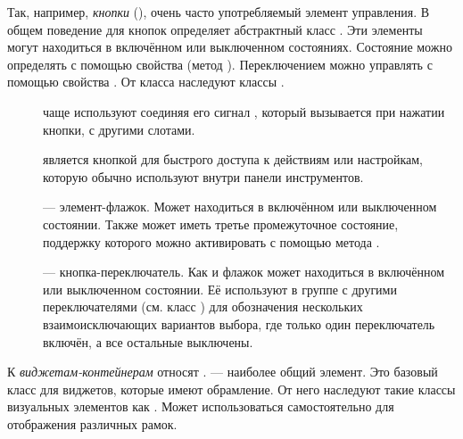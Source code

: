 Так, например, \emph{кнопки} (), очень часто употребляемый элемент управления. В общем поведение для кнопок
определяет абстрактный класс . Эти элементы могут находиться в включённом
или выключенном состояниях. Состояние можно определять с помощью свойства  (метод ). Переключением
можно управлять с помощью свойства  .
 От класса  
наследуют классы  .

\begin{description}
\item[] чаще используют соединяя его сигнал  , который вызывается
при нажатии кнопки, с другими слотами. 
\item[] является кнопкой для быстрого доступа к действиям или настройкам, которую обычно используют внутри панели инструментов.
\item[] --- элемент-флажок. Может находиться в включённом или выключенном
состоянии. Также может иметь третье промежуточное состояние, поддержку которого можно активировать с помощью метода
 .
\item[] --- кнопка-переключатель. Как и флажок может находиться в включённом или выключенном
состоянии. Её используют в группе с другими переключателями (см. класс  ) для обозначения нескольких
взаимоисключающих вариантов выбора, где только один переключатель включён, а все остальные выключены. 
\end{description}

К \emph{виджетам-контейнерам}  относят  .  --- наиболее общий элемент. Это базовый класс для виджетов, которые имеют
обрамление. От него наследуют такие классы визуальных элементов как  . Может использоваться самостоятельно для отображения различных рамок.


